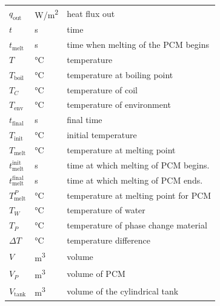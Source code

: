 \documentclass[12pt]{article}
\begin{document}
\begin{longtable*}{l l p{12cm}}
  \\
  $q_\text{out}$ & \si[per-mode=symbol] {\watt\per\square\metre} & heat flux out
  \\
  $t$ & \si[per-mode=symbol] {\second} & time
  \\
  $t_\text{melt}$ & \si[per-mode=symbol] {\second} & time when melting of the
                                                     PCM begins
  \\
  $T$ & \si[per-mode=symbol] {\celsius} & temperature
  \\
  $T_\text{boil}$ & \si[per-mode=symbol] {\celsius} & temperature at boiling point
  \\
  $T_C$ &\si[per-mode=symbol] {\celsius} & temperature of coil
  \\
  $T_\text{env}$ & \si[per-mode=symbol] {\celsius} & temperature of environment
  \\ 
  $t_\text{final}$ & \si[per-mode=symbol] {\second} & final time
  \\ 
  $T_\text{init}$ & \si[per-mode=symbol] {\celsius} & initial temperature
  \\
  $T_\text{melt}$ & \si[per-mode=symbol] {\celsius} & temperature at melting point
  \\
  $t_\text{melt}^\text{init}$ & \si[per-mode=symbol] {\second} & time at which
                                                                 melting of PCM begins.
  \\ 
  $t_\text{melt}^\text{final}$ & \si[per-mode=symbol] {\second} & time at which
                                                                 melting of PCM ends.
  \\ 
  $T_\text{melt}^{P}$ & \si[per-mode=symbol] {\celsius} & temperature at melting
                                                          point for PCM
  \\
  $T_W$ & \si[per-mode=symbol] {\celsius} & temperature of water
  \\
  $T_P$ & \si[per-mode=symbol] {\celsius} & temperature of phase change material
  \\
  $\Delta T$ & \si[per-mode=symbol] {\celsius} & temperature difference
  \\
  $V$ & \si[per-mode=symbol] {\cubic\meter} & volume
  \\
  $V_P$ & \si[per-mode=symbol] {\cubic\meter} & volume of PCM
  \\
  $V_\text{tank}$ & \si[per-mode=symbol] {\cubic\meter} & volume of the
                                                          cylindrical tank
  \\

\end{longtable*}
\end{document}
